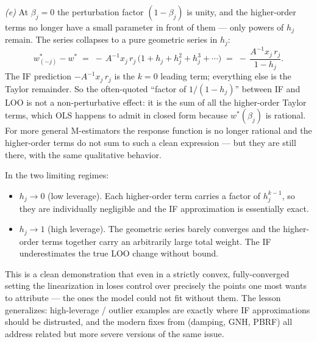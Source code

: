 \begin{solution}[ex:ols-if]
\textit{(e)} At $\beta_j = 0$ the perturbation factor $(1-\beta_j)$ is unity, and the higher-order terms no longer have a small parameter in front of them --- only powers of $h_j$ remain. The series collapses to a pure geometric series in $h_j$:
\[
  w^*_{(-j)} - w^* \;=\; -\,A^{-1} x_j\,r_j\,\bigl(1 + h_j + h_j^{2} + h_j^{3} + \cdots\bigr) \;=\; -\,\frac{A^{-1} x_j\,r_j}{1 - h_j}.
\]
The IF prediction $-A^{-1} x_j\,r_j$ is the $k=0$ leading term; everything else is the Taylor remainder. So the often-quoted ``factor of $1/(1-h_j)$'' between IF and LOO is not a non-perturbative effect: it is the sum of all the higher-order Taylor terms, which OLS happens to admit in closed form because $w^*(\beta_j)$ is rational. For more general M-estimators the response function is no longer rational and the higher-order terms do not sum to such a clean expression --- but they are still there, with the same qualitative behavior.

In the two limiting regimes:
\begin{itemize}
  \item $h_j \to 0$ (low leverage). Each higher-order term carries a factor of $h_j^{k-1}$, so they are individually negligible and the IF approximation is essentially exact.
  \item $h_j \to 1$ (high leverage). The geometric series barely converges and the higher-order terms together carry an arbitrarily large total weight. The IF underestimates the true LOO change without bound.
\end{itemize}
This is a clean demonstration that even in a strictly convex, fully-converged setting the linearization in  loses control over precisely the points one most wants to attribute --- the ones the model could not fit without them. The lesson generalizes: high-leverage / outlier examples are exactly where IF approximations should be distrusted, and the modern fixes from  (damping, GNH, PBRF) all address related but more severe versions of the same issue.

\end{solution}

